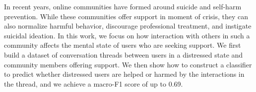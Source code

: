 In recent years, online communities have formed around suicide and self-harm prevention. While these communities offer support in moment of crisis, they can also normalize harmful behavior, discourage professional treatment, and instigate suicidal ideation. In this work, we focus on how interaction with others in such a community affects the mental state of users who are seeking support. We first build a dataset of conversation threads between users in a distressed state and community members offering support. We then show how to construct a classifier to predict whether distressed users are helped or harmed by the interactions in the thread, and we achieve a macro-F1 score of up to 0.69.
